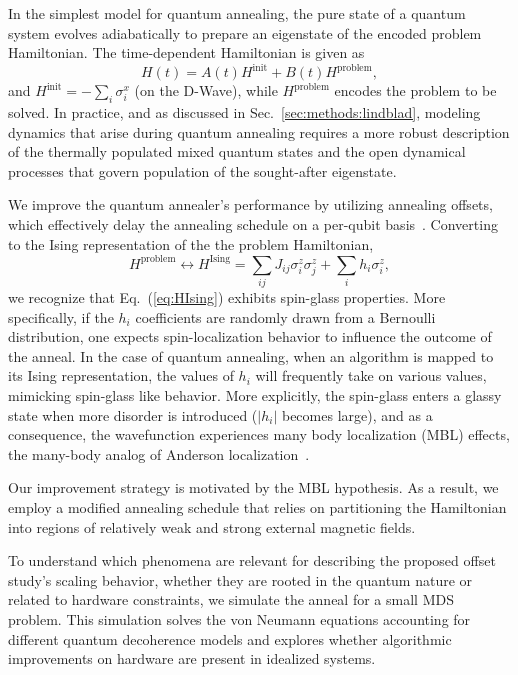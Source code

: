 \documentclass[10pt]{iopart}
\begin{document}
In the simplest model for quantum annealing, the pure state of a quantum system evolves adiabatically to prepare an eigenstate of the encoded problem Hamiltonian. The time-dependent Hamiltonian is given as
\begin{equation}
 H(t) = A(t) H^{\textrm{init}} + B(t) H^{\textrm{problem}}, \label{eq:tdhamiltonian}
\end{equation}
and $H^\textrm{init}=-\sum_i\sigma^x_i$ (on the D-Wave), while $H^\textrm{problem}$ encodes the problem to be solved. In practice, and as discussed in Sec.~\ref{sec:methods:lindblad}, modeling dynamics that arise during quantum annealing requires a more robust description of the thermally populated mixed quantum states and the open dynamical processes that govern population of the sought-after eigenstate.

We improve the quantum annealer's performance by utilizing annealing offsets, which effectively delay the annealing schedule on a per-qubit basis~\cite{PhysRevA.96.042322,hsu2018quantum,10.1007/978-3-030-14082-3_14,2020RPPh...83e4401H}.
Converting to the Ising representation of the the problem Hamiltonian,
\begin{equation}
    \label{eq:HIsing}
     H^{\textrm{problem}} \leftrightarrow H^{\textrm{Ising}} = \sum_{ij} J_{ij} \sigma^z_i \sigma^z_j + \sum_i h_i \sigma^z_i ,
\end{equation}
we recognize that Eq.~(\ref{eq:HIsing}) exhibits spin-glass properties. More specifically, if the $h_i$ coefficients are randomly drawn from a Bernoulli distribution, one expects spin-localization behavior to influence the outcome of the anneal.
In the case of quantum annealing, when an algorithm is mapped to its Ising representation, the values of $h_i$ will frequently take on various values, mimicking spin-glass like behavior.
More explicitly, the spin-glass enters a glassy state when more disorder is introduced ($|h_i|$ becomes large), and as a consequence, the wavefunction experiences many body localization (MBL) effects, the many-body analog of Anderson localization~\cite{doi:10.1146/annurev-conmatphys-031214-014726,PhysRevE.90.022103,RevModPhys.91.021001,ALET2018498,PhysRevB.82.174411,PhysRevLett.109.017202}.

Our improvement strategy is motivated by the MBL hypothesis.
As a result, we employ a modified annealing schedule that relies on partitioning the Hamiltonian into regions of relatively weak and strong external magnetic fields.


To understand which phenomena are relevant for describing the proposed offset study's scaling behavior, whether they are rooted in the quantum nature or related to hardware constraints, we simulate the anneal for a small MDS problem. This simulation solves the von Neumann equations accounting for different quantum decoherence models and explores whether algorithmic improvements on hardware are present in idealized systems.
\end{document}
